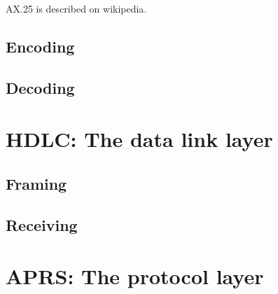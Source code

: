 \documentclass{article}
\begin{document}
AX.25 is described on wikipedia\cite{WikiAX25}.

\subsection{Encoding}
\subsection{Decoding}



\section{HDLC: The data link layer}
\subsection{Framing}
\subsection{Receiving}

\section{APRS: The protocol layer}





\end{document}
